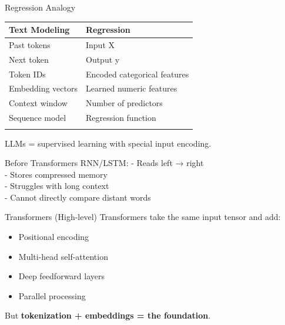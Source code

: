 \documentclass[
  ignorenonframetext,
]{beamer}
\providecommand{\tightlist}{%
  \setlength{\itemsep}{0pt}\setlength{\parskip}{0pt}}
\begin{document}
\begin{frame}{Regression Analogy}
\label{regression-analogy}
\begin{longtable}[]{@{}ll@{}}
\toprule\noalign{}
Text Modeling & Regression \\
\midrule\noalign{}
\endhead
Past tokens & Input X \\
Next token & Output y \\
Token IDs & Encoded categorical features \\
Embedding vectors & Learned numeric features \\
Context window & Number of predictors \\
Sequence model & Regression function \\
\bottomrule\noalign{}
\end{longtable}

LLMs = supervised learning with special input encoding.
\end{frame}

\begin{frame}{Before Transformers}
\label{before-transformers}
RNN/LSTM: - Reads left → right\\
- Stores compressed memory\\
- Struggles with long context\\
- Cannot directly compare distant words
\end{frame}

\begin{frame}{Transformers (High-level)}
\label{transformers-high-level}
Transformers take the same input tensor and add:

\begin{itemize}
\tightlist
\item
  Positional encoding\\
\item
  Multi-head self-attention\\
\item
  Deep feedforward layers\\
\item
  Parallel processing
\end{itemize}

But \textbf{tokenization + embeddings = the foundation}.
\end{frame}
\end{document}
